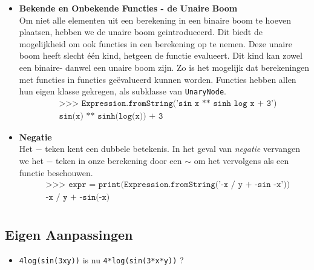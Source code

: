 \documentclass[12pt]{article}
\begin{document}
\begin{itemize}
\item \textbf{Bekende en Onbekende Functies - de Unaire Boom} \\
Om niet alle elementen uit een berekening in een binaire boom te hoeven plaatsen, hebben we de unaire boom geintroduceerd. Dit biedt de mogelijkheid om ook functies in een berekening op te nemen. Deze unaire boom heeft slecht \'e\'en kind, hetgeen de functie evalueert. Dit kind kan zowel een binaire- danwel een unaire boom zijn. Zo is het mogelijk dat berekeningen met functies in functies ge\"evalueerd kunnen worden. Functies hebben allen hun eigen klasse gekregen, als subklasse van \texttt{UnaryNode}. 
\begin{align*}
&\texttt{>>> Expression.fromString('sin x ** sinh log x + 3')}\\
&\texttt{sin(x) ** sinh(log(x)) + 3}
\end{align*}

\item \textbf{Negatie} \\
Het $-$ teken kent een dubbele betekenis. In het geval van \textit{negatie} vervangen we het $-$ teken in onze berekening door een $\sim$ om het vervolgens als een functie beschouwen. 
\begin{align*}
&\texttt{>>> expr =  print(Expression.fromString('-x / y + -sin -x'))}\\
&\texttt{-x / y + -sin(-x)}\\
\end{align*}
\end{itemize}

\subsection*{Eigen Aanpassingen}
\begin{itemize}
\item \texttt{4log(sin(3xy))} is nu \texttt{4*log(sin(3*x*y))} ?
\end{itemize}

\newpage
\end{document}
